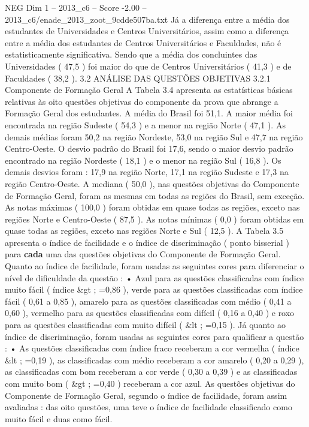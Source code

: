 \begin{textsample}{NEG Dim 1 – 2013\_c6 – Score -2.00 – 2013\_c6/enade\_2013\_zoot\_9cdde507ba.txt}
Já a diferença entre a média dos estudantes de Universidades e Centros Universitários, assim como a diferença entre a média dos estudantes de Centros Universitários e Faculdades, não é estatisticamente significativa.
Sendo que a média dos concluintes das Universidades ( 47,5 ) foi maior do que de Centros Universitários ( 41,3 ) e de Faculdades ( 38,2 ). 3.2 ANÁLISE DAS QUESTÕES OBJETIVAS 3.2.1 Componente de Formação Geral A Tabela 3.4 apresenta as estatísticas básicas relativas às oito questões objetivas do componente da prova que abrange a Formação Geral dos estudantes.
A média do Brasil foi 51,1.
A maior média foi encontrada na região Sudeste ( 54,3 ) e a menor na região Norte ( 47,1 ).
As demais médias foram 50,2 na região Nordeste, 53,0 na região Sul e 47,7 na região Centro-Oeste.
O desvio padrão do Brasil foi 17,6, sendo o maior desvio padrão encontrado na região Nordeste ( 18,1 ) e o menor na região Sul ( 16,8 ).
Os demais desvios foram : 17,9 na região Norte, 17,1 na região Sudeste e 17,3 na região Centro-Oeste.
A mediana ( 50,0 ), nas questões objetivas do Componente de Formação Geral, foram as mesmas em todas as regiões do Brasil, sem exceção.
As notas máximas ( 100,0 ) foram obtidas em quase todas as regiões, exceto nas regiões Norte e Centro-Oeste ( 87,5 ).
As notas mínimas ( 0,0 ) foram obtidas em quase todas as regiões, exceto nas regiões Norte e Sul ( 12,5 ).
A Tabela 3.5 apresenta o índice de facilidade e o índice de discriminação ( ponto bisserial ) para \textbf{cada} uma das questões objetivas do Componente de Formação Geral.
Quanto ao índice de facilidade, foram usadas as seguintes cores para diferenciar o nível de dificuldade da questão : • Azul para as questões classificadas com índice muito fácil ( índice \&gt ; =0,86 ), verde para as questões classificadas com índice fácil ( 0,61 a 0,85 ), amarelo para as questões classificadas com médio ( 0,41 a 0,60 ), vermelho para as questões classificadas com difícil ( 0,16 a 0,40 ) e roxo para as questões classificadas com muito difícil ( \&lt ; =0,15 ).
Já quanto ao índice de discriminação, foram usadas as seguintes cores para qualificar a questão : • As questões classificadas com índice fraco receberam a cor vermelha ( índice \&lt ; =0,19 ), as classificadas com médio receberam a cor amarelo ( 0,20 a 0,29 ), as classificadas com bom receberam a cor verde ( 0,30 a 0,39 ) e as classificadas com muito bom ( \&gt ; =0,40 ) receberam a cor azul.
As questões objetivas do Componente de Formação Geral, segundo o índice de facilidade, foram assim avaliadas : das oito questões, uma teve o índice de facilidade classificado como muito fácil e duas como fácil.

\end{textsample}
